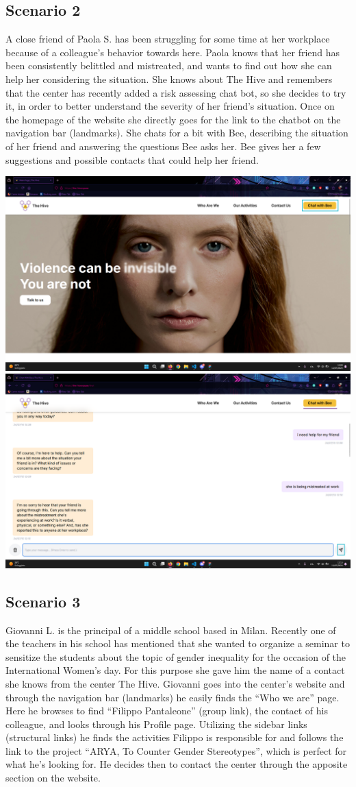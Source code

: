 \subsection{Scenario 2}
A close friend of Paola S. has been struggling for some time at her workplace because of a colleague’s behavior towards here.
Paola knows that her friend has been consistently belittled and mistreated, and wants to find out how she can help her considering
the situation. She knows about The Hive and remembers that the center has recently added a risk assessing chat bot, so she decides
to try it, in order to better understand the severity of her friend's situation. Once on the homepage of the website she directly
goes for the link to the chatbot on the navigation bar (landmarks).
She chats for a bit with Bee, describing the situation of her friend and answering the questions Bee asks her.
Bee gives her a few suggestions and possible contacts that could help her friend.

\vspace{2em}
\includegraphics[width=0.5\linewidth]{img/design-document/interaction-scenarios/scenario2/step-1.png}
\includegraphics[width=0.5\linewidth]{img/design-document/interaction-scenarios/scenario2/step-2.png}

\subsection{Scenario 3}
Giovanni L. is the principal of a middle school based in Milan. Recently one of the teachers in his school has mentioned that she
wanted to organize a seminar to sensitize the students about the topic of gender inequality for the occasion of the International
Women’s day. For this purpose she gave him the name of a contact she knows from the center The Hive.  Giovanni goes into the center’s
website and through the navigation bar (landmarks) he easily finds the “Who we are” page. Here he browses to find “Filippo Pantaleone”
(group link), the contact of his colleague, and looks through his Profile page. Utilizing the sidebar links (structural links) he finds
the activities Filippo is responsible for and follows the link to the project “ARYA, To Counter Gender Stereotypes”, which is perfect for
what he’s looking for. He decides then to contact the center through the apposite section on the website.

